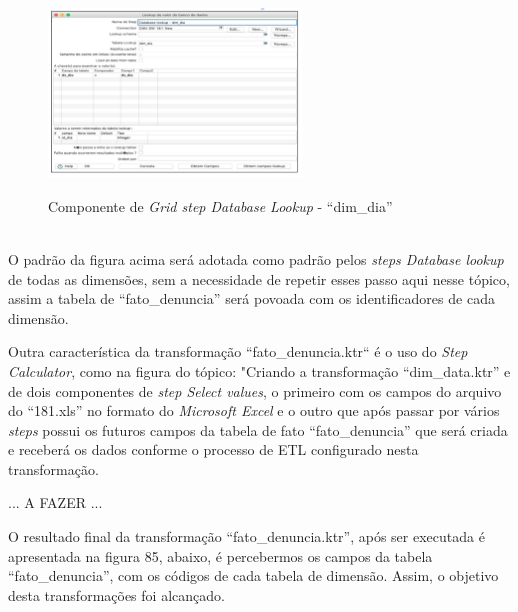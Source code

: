 \begin{figure}[H]
	\vspace*{0,2cm}
    \centering
    \caption{Componente de \textit{Grid step Database Lookup} - ``dim\_dia''}
    \includegraphics[width=0.6\textwidth]{./04-figuras/figura-dl-dim-dia}
    \label{fig:ilustfigdldimdia}
\end{figure}
\vspace*{-0,9cm}
{\raggedright {}} \\

O padr\~{a}o da figura acima ser\'{a} adotada como padr\~{a}o pelos \textit{steps Database lookup} de 
todas as dimens\~{o}es, sem a necessidade de repetir esses passo aqui nesse t\'opico, assim a tabela de 
``fato\_denuncia'' ser\'{a} povoada com os identificadores de cada dimens\~{a}o.

Outra caracter\'{i}stica da transforma\c{c}\~{a}o ``fato\_denuncia.ktr`` \'{e} o uso do \textit{Step Calculator}, 
como na figura do t\'opico: "Criando a transforma\c{c}\~{a}o ``dim\_data.ktr'' e  de dois componentes de 
\textit{step Select values}, o primeiro com os campos do arquivo do ``181.xls'' no formato do 
\textit{Microsoft Excel} e o outro que ap\'os passar por v\'{a}rios \textit{steps} possui os futuros campos da tabela de fato 
``fato\_denuncia'' que ser\'{a} criada e receber\'{a} os dados conforme o processo de ETL configurado nesta transforma\c{c}\~{a}o.

... A FAZER ...

O resultado final da transforma\c{c}\~{a}o ``fato\_denuncia.ktr'', ap\'os ser executada \'{e} apresentada na figura 85, abaixo, 
\'{e} percebermos os campos da tabela ``fato\_denuncia'', com os c\'odigos de cada tabela de dimens\~{a}o.
Assim, o objetivo desta transforma\c{c}\~{o}es foi alcan\c{c}ado.

